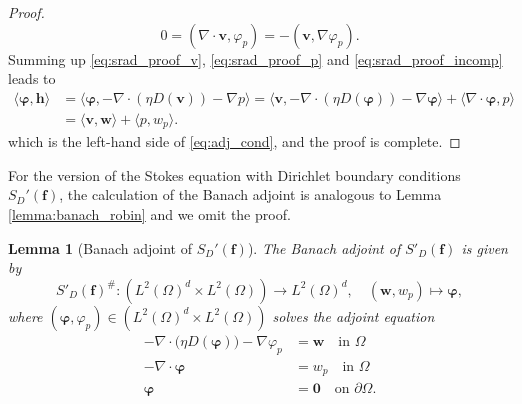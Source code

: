 \documentclass[final,leqno]{scrarticle}
\newtheorem{lemma}[theorem]{Lemma}
\newcommand{\lzo}{L^2(\Omega)}
\newcommand{\lzd}{{L^2(\Omega)^d}}
\begin{document}
\begin{proof}
    \begin{equation}\label{eq:srad_proof_incomp}
     0=(\nabla \cdot \mathbf{v} , \varphi_p)= -(\mathbf{v}, \nabla \varphi_p) .
    \end{equation}
    Summing up \eqref{eq:srad_proof_v}, \eqref{eq:srad_proof_p} and \eqref{eq:srad_proof_incomp} leads to
    \begin{equation}
        \begin{split}
            \langle \boldsymbol{\varphi},\mathbf{h}\rangle 
            &= \langle \boldsymbol{\varphi}, - \nabla \cdot (\eta D(\mathbf{v})) - \nabla p \rangle 
            = \langle \mathbf{v}, - \nabla \cdot (\eta D(\boldsymbol{\varphi}) ) - \nabla \boldsymbol{\varphi} \rangle + \langle \nabla \cdot \boldsymbol{\varphi} , p \rangle \\
            & = \langle \mathbf{v},\mathbf{w}\rangle + \langle p, w_p \rangle.
        \end{split}
    \end{equation}
which is the left-hand side of \eqref{eq:adj_cond}, and the proof is complete.
\end{proof}


For the version of the Stokes equation with Dirichlet boundary conditions $S_D'(\mathbf{f})$, the calculation of the Banach adjoint is analogous to Lemma \ref{lemma:banach_robin} and we omit the proof. 

\begin{lemma}[Banach adjoint of $S_D'(\mathbf{f})$]
    \label{lemma:SD_Banach}
    The Banach adjoint of $S'_D(\mathbf{f})$ is given by
    \begin{displaymath}
        {S'_D(\mathbf{f})}^{\#}: \left(\lzd \times \lzo\right) \rightarrow \lzd, \quad (\mathbf{w},w_p) \mapsto \boldsymbol{\varphi},
    \end{displaymath}
    where $(\boldsymbol{\varphi},\varphi_p)\in \left(\lzd \times \lzo\right)$ solves the adjoint equation
        \begin{displaymath}
    \begin{split}
    -\nabla \cdot \big( \eta D(\boldsymbol{\varphi}) \big) - \nabla \varphi_p &= \mathbf{w} \quad \text{in } \Omega\\
    - \nabla \cdot \boldsymbol{\varphi} &= w_p \quad \text{in } \Omega\\
    \boldsymbol{\varphi} &= \mathbf{0} \quad \text{on } \partial\Omega.
    \end{split}
    \end{displaymath}
\end{lemma}
\end{document}
